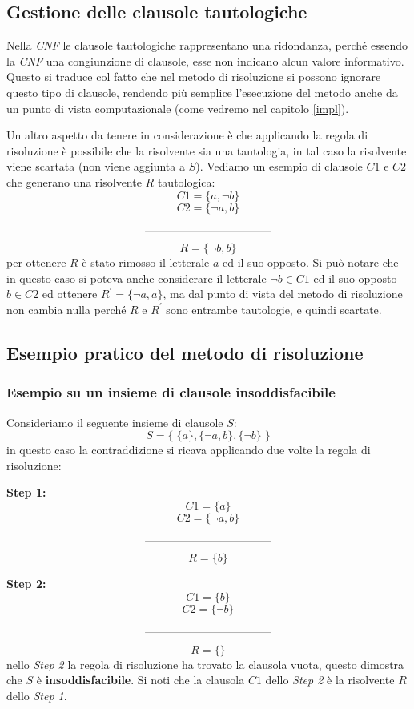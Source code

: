 \documentclass[a4paper,12pt]{report}
\begin{document}
\subsection{Gestione delle clausole tautologiche}
Nella \textit{CNF} le clausole tautologiche rappresentano una ridondanza, perché essendo la \textit{CNF} una congiunzione di clausole, esse non indicano alcun valore informativo. Questo si traduce col fatto che nel metodo di risoluzione si possono ignorare questo tipo di clausole, rendendo più semplice l'esecuzione del metodo anche da un punto di vista computazionale (come vedremo nel capitolo \ref{impl}).

Un altro aspetto da tenere in considerazione è che applicando la regola di risoluzione è possibile che la risolvente sia una tautologia, in tal caso la risolvente viene scartata (non viene aggiunta a $S$). Vediamo un esempio di clausole $C1$ e $C2$ che generano una risolvente $R$ tautologica:
\[C1 = \{ a, \lnot b \}\]
\[C2 = \{ \lnot a, b \}\]
\[ \rule{4cm}{0.2pt} \]
\[R = \{ \lnot b, b \}\]
per ottenere $R$ è stato rimosso il letterale $a$ ed il suo opposto. Si può notare che in questo caso si poteva anche considerare il letterale $\lnot b \in C1$ ed il suo opposto $b \in C2$ ed ottenere $R^{'} = \{ \lnot a, a \}$, ma dal punto di vista del metodo di risoluzione non cambia nulla perché $R$ e $R^{'}$ sono entrambe tautologie, e quindi scartate.

\subsection{Esempio pratico del metodo di risoluzione}
\subsubsection{Esempio su un insieme di clausole insoddisfacibile}
Consideriamo il seguente insieme di clausole $S$:
\[ S = \{ \; \{a\}, \{\lnot a, b\}, \{\lnot b\} \; \} \]
in questo caso la contraddizione si ricava applicando due volte la regola di risoluzione:

\textbf{Step 1:} \[ C1 = \{a\} \] \[ C2 = \{\lnot a, b\} \] \[ \rule{4cm}{0.2pt} \] \[R = \{b \}\]

\textbf{Step 2:} \[ C1 = \{b\} \] \[ C2 = \{\lnot b\} \] \[ \rule{4cm}{0.2pt} \] \[R = \{\}\]
nello \textit{Step 2} la regola di risoluzione ha trovato la clausola vuota, questo dimostra che $S$ è \textbf{insoddisfacibile}. Si noti che la clausola $C1$ dello \textit{Step 2} è la risolvente $R$ dello \textit{Step 1}.
\end{document}
